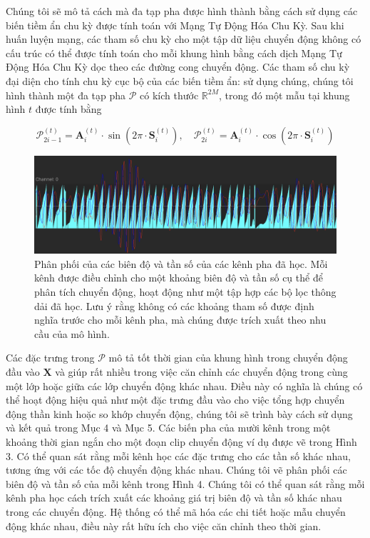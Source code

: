 Chúng tôi sẽ mô tả cách mà đa tạp pha được hình thành bằng cách sử dụng các biến tiềm ẩn chu kỳ được tính toán với Mạng Tự Động Hóa Chu Kỳ. Sau khi huấn luyện mạng, các tham số chu kỳ cho một tập dữ liệu chuyển động không có cấu trúc có thể được tính toán cho mỗi khung hình bằng cách dịch Mạng Tự Động Hóa Chu Kỳ dọc theo các đường cong chuyển động. Các tham số chu kỳ đại diện cho tính chu kỳ cục bộ của các biến tiềm ẩn: sử dụng chúng, chúng tôi hình thành một đa tạp pha $\mathcal{P}$ có kích thước $\mathbb{R}^{2M}$, trong đó một mẫu tại khung hình $t$ được tính bằng

\begin{equation}
	\label{eq:phase_define}
	\mathcal{P}^{(t)}_{2i-1} = \textbf{A}^{(t)}_i \cdot \sin(2\pi \cdot \textbf{S}^{(t)}_i), \quad \mathcal{P}^{(t)}_{2i} = \textbf{A}^{(t)}_i \cdot \cos(2\pi \cdot \textbf{S}^{(t)}_i)
\end{equation}


\begin{figure}
	\centering
	\includegraphics[width=\linewidth]{images/PhaseChannel.png}
	\caption{Phân phối của các biên độ và tần số của các kênh pha đã học. Mỗi kênh được điều chỉnh cho một khoảng biên độ và tần số cụ thể để phân tích chuyển động, hoạt động như một tập hợp các bộ lọc thông dải đã học. Lưu ý rằng không có các khoảng tham số được định nghĩa trước cho mỗi kênh pha, mà chúng được trích xuất theo nhu cầu của mô hình.}
	\label{fig:PhaseChannel}
\end{figure}


Các đặc trưng trong $\mathcal{P}$ mô tả tốt thời gian của khung hình trong chuyển động đầu vào $\textbf{X}$ và giúp rất nhiều trong việc căn chỉnh các chuyển động trong cùng một lớp hoặc giữa các lớp chuyển động khác nhau. Điều này có nghĩa là chúng có thể hoạt động hiệu quả như một đặc trưng đầu vào cho việc tổng hợp chuyển động thần kinh hoặc so khớp chuyển động, chúng tôi sẽ trình bày cách sử dụng và kết quả trong Mục 4 và Mục 5. Các biến pha của mười kênh trong một khoảng thời gian ngắn cho một đoạn clip chuyển động ví dụ được vẽ trong Hình 3. Có thể quan sát rằng mỗi kênh học các đặc trưng cho các tần số khác nhau, tương ứng với các tốc độ chuyển động khác nhau. Chúng tôi vẽ phân phối các biên độ và tần số của mỗi kênh trong Hình 4. Chúng tôi có thể quan sát rằng mỗi kênh pha học cách trích xuất các khoảng giá trị biên độ và tần số khác nhau trong các chuyển động. Hệ thống có thể mã hóa các chi tiết hoặc mẫu chuyển động khác nhau, điều này rất hữu ích cho việc căn chỉnh theo thời gian.

